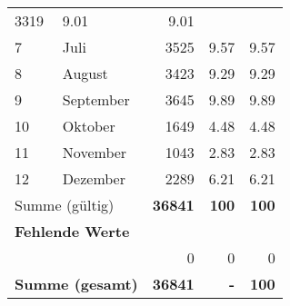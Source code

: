 \begin{longtable}{lXrrr}
       \num{3319} &
       \num[round-mode=places,round-precision=2]{9,01} &
         \num[round-mode=places,round-precision=2]{9,01} \\

     7 &
     \multicolumn{1}{X}{ Juli   } &


       \num{3525} &
       \num[round-mode=places,round-precision=2]{9,57} &
         \num[round-mode=places,round-precision=2]{9,57} \\

     8 &
     \multicolumn{1}{X}{ August   } &


       \num{3423} &
       \num[round-mode=places,round-precision=2]{9,29} &
         \num[round-mode=places,round-precision=2]{9,29} \\

     9 &
     \multicolumn{1}{X}{ September   } &


       \num{3645} &
       \num[round-mode=places,round-precision=2]{9,89} &
         \num[round-mode=places,round-precision=2]{9,89} \\

     10 &
     \multicolumn{1}{X}{ Oktober   } &


       \num{1649} &
       \num[round-mode=places,round-precision=2]{4,48} &
         \num[round-mode=places,round-precision=2]{4,48} \\

     11 &
     \multicolumn{1}{X}{ November   } &


       \num{1043} &
       \num[round-mode=places,round-precision=2]{2,83} &
         \num[round-mode=places,round-precision=2]{2,83} \\

     12 &
     \multicolumn{1}{X}{ Dezember   } &


       \num{2289} &
       \num[round-mode=places,round-precision=2]{6,21} &
         \num[round-mode=places,round-precision=2]{6,21} \\
     \midrule
     \multicolumn{2}{l}{Summe (gültig)} &
       \textbf{\num{36841}} &
     \textbf{100} &
       \textbf{\num[round-mode=places,round-precision=2]{100}} \\
     \multicolumn{5}{l}{\textbf{Fehlende Werte}}\\
      & & 0 & 0 & 0 \\
     \midrule
     \multicolumn{2}{l}{\textbf{Summe (gesamt)}} &
          \textbf{\num{36841}} &
        \textbf{-} &
        \textbf{100} \\
     \bottomrule
     \end{longtable}
     
